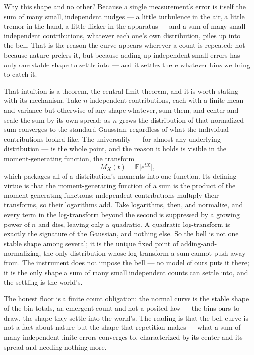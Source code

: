 Why this shape and no other? Because a single measurement's error is itself the sum of many small,
independent nudges --- a little turbulence in the air, a little tremor in the hand, a little flicker in the
apparatus --- and a sum of many small independent contributions, whatever each one's own distribution, piles
up into the bell. That is the reason the curve appears wherever a count is repeated: not because nature
prefers it, but because adding up independent small errors has only one stable shape to settle into --- and it settles
there whatever bins we bring to catch it.

That intuition is a theorem, the central limit theorem, and it is worth stating with its mechanism. Take $n$
independent contributions, each with a finite mean and variance but otherwise of any shape whatever, sum them,
and center and scale the sum by its own spread; as $n$ grows the distribution of that normalized sum converges
to the standard Gaussian, regardless of what the individual contributions looked like. The universality ---
for almost any underlying distribution --- is the whole point, and the reason it holds is visible in the
moment-generating function, the transform
\begin{equation}
  M_X(t) = \mathbb{E}\bigl[e^{tX}\bigr],
\end{equation}
which packages all of a distribution's moments into one function. Its defining virtue is that the
moment-generating function of a sum is the product of the moment-generating functions: independent
contributions multiply their transforms, so their logarithms add. Take logarithms, then, and normalize, and
every term in the log-transform beyond the second is suppressed by a growing power of $n$ and dies, leaving
only a quadratic. A quadratic log-transform is exactly the signature of the Gaussian, and nothing else. So the
bell is not one stable shape among several; it is the unique fixed point of adding-and-normalizing, the only
distribution whose log-transform a sum cannot push away from. The instrument does not impose the bell --- no
model of ours puts it there; it is the only shape a sum of many small independent counts can settle into, and
the settling is the world's.

The
honest floor is a finite count obligation: the normal curve is the stable shape of the bin totals, an
emergent count and not a posited law --- the bins ours to draw, the shape they settle into the world's. The
reading is that the bell curve is not a fact about nature but the
shape that repetition makes --- what a sum of many independent finite errors converges to, characterized by
its center and its spread and needing nothing more.


